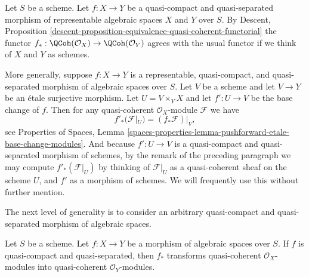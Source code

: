 \noindent
Let $S$ be a scheme. Let $f : X \to Y$ be a quasi-compact and
quasi-separated morphism of representable algebraic spaces $X$
and $Y$ over $S$. By
Descent,
Proposition \ref{descent-proposition-equivalence-quasi-coherent-functorial}
the functor
$f_* : \QCoh(\mathcal{O}_X) \to \QCoh(\mathcal{O}_Y)$
agrees with the usual functor if we think of $X$ and $Y$ as schemes.

\medskip\noindent
More generally, suppose $f : X \to Y$ is a representable, quasi-compact, and
quasi-separated morphism of algebraic spaces over $S$. Let $V$ be a scheme
and let $V \to Y$ be an \'etale surjective morphism. Let $U = V \times_Y X$
and let $f' : U \to V$ be the base change of $f$. Then for any
quasi-coherent $\mathcal{O}_X$-module $\mathcal{F}$ we have
\begin{equation}
\label{equation-representable-pushforward}
f'_*(\mathcal{F}|_U) = (f_*\mathcal{F})|_V,
\end{equation}
see
Properties of Spaces,
Lemma \ref{spaces-properties-lemma-pushforward-etale-base-change-modules}.
And because $f' : U \to V$ is a quasi-compact and quasi-separated
morphism of schemes, by the remark of the preceding paragraph we may
compute $f'_*(\mathcal{F}|_U)$ by thinking of $\mathcal{F}|_U$ as a
quasi-coherent sheaf on the scheme $U$, and $f'$ as a morphism of schemes.
We will frequently use this without further mention.

\medskip\noindent
The next level of generality is to consider an arbitrary
quasi-compact and quasi-separated morphism of algebraic spaces.

\begin{lemma}
\label{lemma-pushforward}
Let $S$ be a scheme.
Let $f : X \to Y$ be a morphism of algebraic spaces over $S$.
If $f$ is quasi-compact and quasi-separated, then $f_*$ transforms
quasi-coherent $\mathcal{O}_X$-modules into
quasi-coherent $\mathcal{O}_Y$-modules.
\end{lemma}


